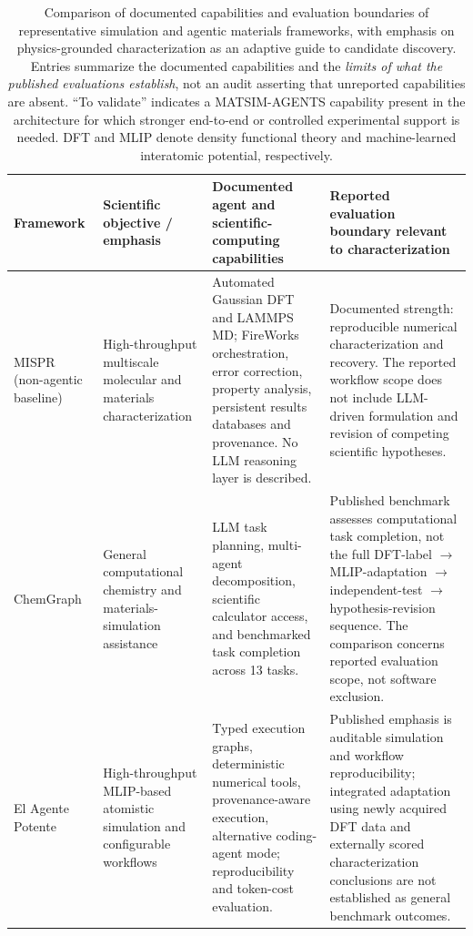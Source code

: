 \documentclass[11pt,a4paper]{article}
\begin{document}
\begin{table}[htbp]
\centering
\caption{Comparison of documented capabilities and evaluation boundaries of representative simulation and agentic materials frameworks, with emphasis on physics-grounded characterization as an adaptive guide to candidate discovery. Entries summarize the documented capabilities and the \emph{limits of what the published evaluations establish}, not an audit asserting that unreported capabilities are absent. ``To validate'' indicates a MATSIM-AGENTS capability present in the architecture for which stronger end-to-end or controlled experimental support is needed. DFT and MLIP denote density functional theory and machine-learned interatomic potential, respectively.}
\label{tab:agentic_comparison}
\scriptsize
\setlength{\tabcolsep}{4pt}
\renewcommand{\arraystretch}{1.06}
\begin{tabularx}{\textwidth}{@{}>{\RaggedRight\arraybackslash}p{}>{\RaggedRight\arraybackslash}p{}>{\RaggedRight\arraybackslash}X >{\RaggedRight\arraybackslash}p{}@{}}
\toprule
\textbf{Framework} & \textbf{Scientific objective / emphasis} & \textbf{Documented agent and scientific-computing capabilities} & \textbf{Reported evaluation boundary relevant to characterization} \\
\midrule
MISPR~\cite{atwi2022mispr} (non-agentic baseline) & High-throughput multiscale molecular and materials characterization & Automated Gaussian DFT and LAMMPS MD; FireWorks orchestration, error correction, property analysis, persistent results databases and provenance. No LLM reasoning layer is described. & Documented strength: reproducible numerical characterization and recovery. The reported workflow scope does not include LLM-driven formulation and revision of competing scientific hypotheses. \\
\addlinespace
ChemGraph~\cite{chemgraph2026} & General computational chemistry and materials-simulation assistance & LLM task planning, multi-agent decomposition, scientific calculator access, and benchmarked task completion across 13 tasks. & Published benchmark assesses computational task completion, not the full DFT-label $\rightarrow$ MLIP-adaptation $\rightarrow$ independent-test $\rightarrow$ hypothesis-revision sequence. The comparison concerns reported evaluation scope, not software exclusion. \\
\addlinespace
El Agente Potente~\cite{potente2026} & High-throughput MLIP-based atomistic simulation and configurable workflows & Typed execution graphs, deterministic numerical tools, provenance-aware execution, alternative coding-agent mode; reproducibility and token-cost evaluation. & Published emphasis is auditable simulation and workflow reproducibility; integrated adaptation using newly acquired DFT data and externally scored characterization conclusions are not established as general benchmark outcomes. \\

\end{tabularx}
\end{table}
\end{document}
